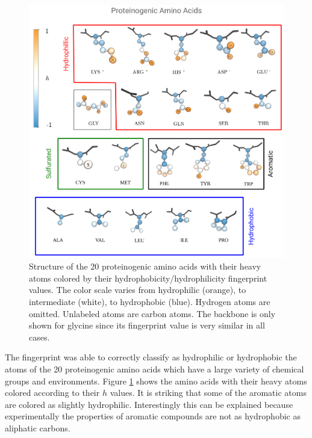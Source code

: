 \begin{figure}
\centering
\includegraphics[width=\columnwidth]{./images/aa.png}
\caption[Fingerprint values for the 20 aminoacids]{ Structure of the 20 proteinogenic amino 
acids with their heavy atoms colored by their 
hydrophobicity/hydrophilicity fingerprint values. The color scale varies from hydrophilic 
(orange),
to intermediate (white), to hydrophobic (blue). Hydrogen atoms are omitted. Unlabeled atoms are 
carbon atoms. The backbone is only shown for glycine since its fingerprint value is very similar in 
all cases. }
\label{aa}

\end{figure}
The fingerprint was able to correctly classify as hydrophilic or hydrophobic the atoms of the 
20 
proteinogenic amino acids which have a large variety of chemical groups and  environments. 
Figure \ref{aa} shows the amino acids with their heavy atoms colored 
according to their $h$ values. It is striking that some of 
the aromatic atoms are colored as 
slightly hydrophilic. Interestingly this can be explained because experimentally the 
properties of 
aromatic compounds are not as hydrophobic as aliphatic 
carbons\cite{JPhysChem_McAuliffe_1966,JSolvChem_Cabani_1981,Ben-Amotz2016,Harris2016}. 

